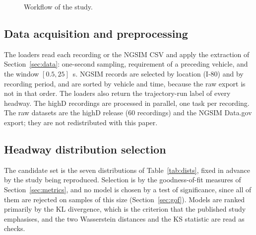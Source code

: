 \documentclass[11pt,a4paper]{article}
\numberwithin{equation}{section}
\begin{document}
\begin{figure}[!htbp]
\centering
{}
\caption{Workflow of the study.}\label{fig:workflow}
\end{figure}

\subsection{Data acquisition and preprocessing}
The loaders read each recording or the NGSIM CSV and apply the extraction of Section~\ref{sec:data}: one-second
sampling, requirement of a preceding vehicle, and the window $[0.5,25]$~s. NGSIM records are selected by location (I-80) and
by recording period, and are sorted by vehicle and time, because the raw export is not in that order. The loaders also return the
trajectory-run label of every headway. The highD recordings are processed in parallel, one task per recording. The raw datasets
are the highD release (60 recordings) and the NGSIM Data.gov export; they are not redistributed with this paper.

\subsection{Headway distribution selection}
The candidate set is the seven distributions of Table~\ref{tab:dists}, fixed in advance by the study being reproduced.
Selection is by the goodness-of-fit measures of Section~\ref{sec:metrics}, and no model is chosen by a test of significance, since all
of them are rejected on samples of this size (Section~\ref{sec:gof}). Models are ranked primarily by the KL divergence, which is the
criterion that the published study emphasises, and the two Wasserstein distances and the KS statistic are read as checks.
\end{document}
